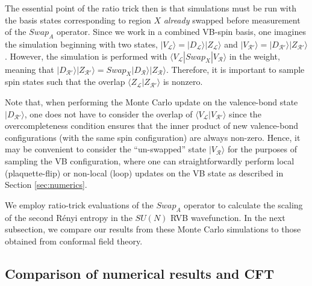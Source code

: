 \documentclass[11pt]{iopart}
\begin{document}
The essential point of the ratio trick then is that simulations must be run with the basis states corresponding to region $X$ {\it already} swapped before measurement of the $Swap_A$ operator.  Since we work in a combined VB-spin basis, one imagines the simulation beginning with 
two states, $|V_{\mathcal L} \rangle = |D_{\mathcal L} \rangle | Z_{\mathcal L} \rangle$ and $|V_{\mathcal R'} \rangle = |D_{\mathcal R'}  \rangle | Z_{\mathcal R'} \rangle$.  However, the simulation is performed with ${\langle V_{\mathcal{L}} | Swap_X | V_{\mathcal{R}} \rangle}$ in the weight, 
meaning that $ |D_{\mathcal R'} \rangle | Z_{\mathcal R'} \rangle = Swap_X |D_{\mathcal R} \rangle | Z_{\mathcal R} \rangle  $.  Therefore, it is important to sample spin states such that the overlap $\langle Z_{\mathcal L} | Z_{\mathcal R '} \rangle$ is nonzero.  

Note that, when performing the Monte Carlo update on the valence-bond state $| D_{\mathcal{R} '} \rangle$, one does not have to consider the overlap of $\langle V_{\mathcal{L}} | V_{\mathcal{R}'} \rangle$ since the overcompleteness condition ensures that the inner product of new valence-bond configurations (with the same spin configuration) are always non-zero.  Hence, it may be convenient to consider the ``un-swapped'' state $|V_{\mathcal R} \rangle$ for the purposes of sampling the VB configuration, where one can straightforwardly perform local (plaquette-flip) or non-local (loop) updates on the VB state as described in 
Section \ref{sec:numerics}.

We employ ratio-trick evaluations of the $Swap_A$ operator to calculate the scaling of the second R\'enyi entropy in the $SU(N)$ RVB wavefunction.  In the next subsection, we compare our results from these Monte Carlo simulations to those obtained from conformal field theory.


\subsection{Comparison of numerical results and CFT}
\end{document}
